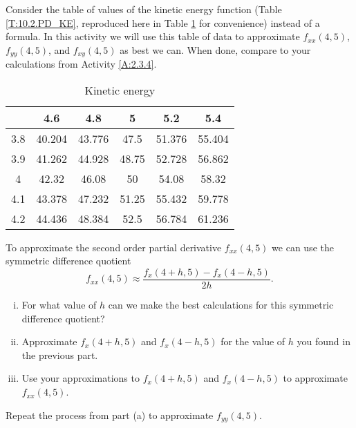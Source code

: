 \begin{activity} \label{A:10.3.5} Consider the table of values of the kinetic energy function (Table \ref{T:10.2.PD_KE}, reproduced here in Table \ref{T:10.3.PD_KE_2} for convenience) instead of a formula. In this activity we will use this table of data to approximate $f_{xx}(4,5)$, $f_{yy}(4,5)$, and $f_{xy}(4,5)$ as best we can. When done, compare to your calculations from Activity \ref{A:2.3.4}.
\begin{table}[ht]
\begin{center}
\begin{tabular}{|c|c|c|c|c|c|} \hline
	&4.6    &4.8    &5      &5.2    &5.4 \\ \hline
3.8	&40.204 &43.776	&47.5   &51.376	&55.404 \\ \hline
3.9	&41.262	&44.928	&48.75	&52.728	&56.862 \\ \hline
4	&42.32	&46.08	&50	    &54.08	&58.32 \\ \hline
4.1	&43.378	&47.232	&51.25	&55.432	&59.778 \\ \hline
4.2	&44.436	&48.384	&52.5	&56.784	&61.236 \\ \hline
\end{tabular}
\caption{Kinetic energy}
\label{T:10.3.PD_KE_2}
\end{center}
\end{table}

    \ba
    \item To approximate the second order partial derivative $f_{xx}(4,5)$ we can use the symmetric difference quotient
    \[f_{xx}(4,5) \approx \frac{f_x(4+h,5) - f_x(4-h,5)}{2h}.\]
        \begin{enumerate}[i.]
        \item For what value of $h$ can we make the best calculations for this symmetric difference quotient?



        \item Approximate $f_x(4+h,5)$ and $f_x(4-h,5)$ for the value of $h$ you found in the previous part.



        \item Use your approximations to $f_x(4+h,5)$ and $f_x(4-h,5)$ to approximate $f_{xx}(4,5)$.



        \end{enumerate}

    \item Repeat the process from part (a) to approximate $f_{yy}(4,5)$.




\end{activity}
